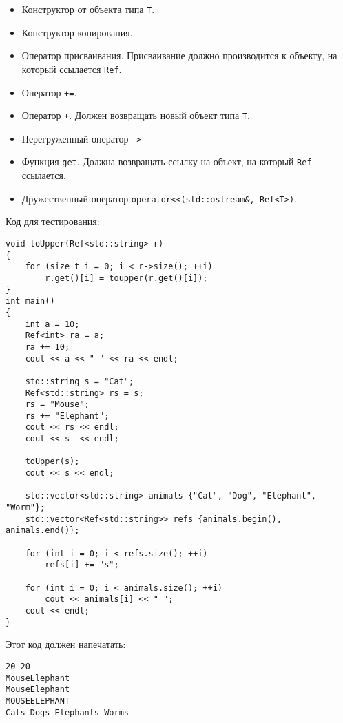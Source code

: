 \documentclass{article}
\begin{document}
\begin{itemize}
\item Конструктор от объекта типа \texttt{T}.
\item Конструктор копирования.
\item Оператор присваивания. Присваивание должно производится к объекту, на который ссылается \texttt{Ref}.
\item Оператор \texttt{+=}.
\item Оператор \texttt{+}. Должен возвращать новый объект типа \texttt{T}.
\item Перегруженный оператор \texttt{->}
\item Функция \texttt{get}. Должна возвращать ссылку на объект, на который \texttt{Ref} ссылается.
\item Дружественный оператор \texttt{operator<{}<(std::ostream\&, Ref<T>)}. 
\end{itemize}

Код для тестирования:
\begin{lstlisting}
void toUpper(Ref<std::string> r)
{
    for (size_t i = 0; i < r->size(); ++i)
        r.get()[i] = toupper(r.get()[i]);
}
int main()
{
    int a = 10;
    Ref<int> ra = a;
    ra += 10;
    cout << a << " " << ra << endl;

    std::string s = "Cat";
    Ref<std::string> rs = s;
    rs = "Mouse";
    rs += "Elephant";
    cout << rs << endl;
    cout << s  << endl;
    
    toUpper(s);
    cout << s << endl;

    std::vector<std::string> animals {"Cat", "Dog", "Elephant", "Worm"};
    std::vector<Ref<std::string>> refs {animals.begin(), animals.end()};

    for (int i = 0; i < refs.size(); ++i)
        refs[i] += "s";

    for (int i = 0; i < animals.size(); ++i)
        cout << animals[i] << " ";
    cout << endl;
}
\end{lstlisting}
Этот код должен напечатать:
\begin{verbatim}
20 20
MouseElephant
MouseElephant
MOUSEELEPHANT
Cats Dogs Elephants Worms 
\end{verbatim}
\end{document}
